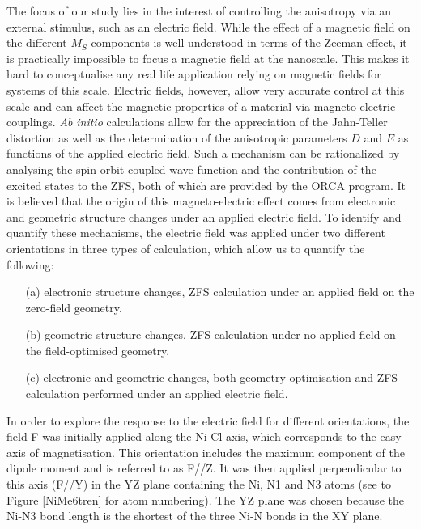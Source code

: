 \documentclass[12pt]{report}
\numberwithin{equation}{section}
\begin{document}
\par The focus of our study lies in the interest of controlling the anisotropy via an external stimulus, such as an electric field.
While the effect of a magnetic field on the different $M_S$ components is well understood in terms of the Zeeman effect, it is practically impossible to focus a magnetic field at the nanoscale.
This makes it hard to conceptualise any real life application relying on magnetic fields for systems of this scale.
Electric fields, however, allow very accurate control at this scale and can affect the magnetic properties of a material via magneto-electric couplings.
\textit{Ab} \textit{initio} calculations allow for the appreciation of the Jahn-Teller distortion as well as the determination of the anisotropic parameters $D$ and $E$ as functions of the applied electric field.
Such a mechanism can be rationalized by analysing the spin-orbit coupled wave-function and the contribution of the excited states to the ZFS, both of which are provided by the ORCA program.
It is believed that the origin of this magneto-electric effect comes from electronic and geometric structure changes under an applied electric field. 
To identify and quantify these mechanisms, the electric field was applied under two different orientations in three types of calculation, which allow us to quantify the following:

\begin{itemize}
    \item[(a)] electronic structure changes, ZFS calculation under an applied field on the zero-field geometry.
    \item[(b)] geometric structure changes, ZFS calculation under no applied field on the field-optimised geometry.
    \item[(c)] electronic and geometric changes, both geometry optimisation and ZFS calculation performed under an applied electric field.
\end{itemize}

In order to explore the response to the electric field for different orientations, the field F was initially applied along the Ni-Cl axis, which corresponds to the easy axis of magnetisation.
This orientation includes the maximum component of the dipole moment and is referred to as F//Z.
It was then applied perpendicular to this axis (F//Y) in the YZ plane containing the Ni, N1 and N3 atoms (see to Figure \ref{NiMe6tren} for atom numbering). 
The YZ plane was chosen because the Ni-N3 bond length is the shortest of the three Ni-N bonds in the XY plane.
\end{document}

